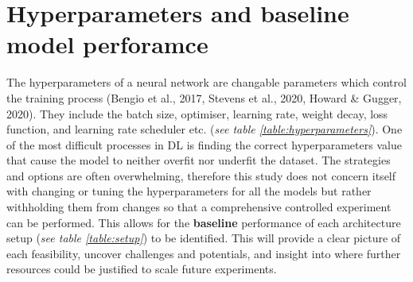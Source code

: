 \documentclass[11pt, a4paper, twoside]{report}
\begin{document}
\begin{table}[H]
  \centering
  \label{table:setup}
  \caption{The U-Nets and the variations thereof selected for this study}
\end{table}

\section{Hyperparameters and baseline model perforamce}

The hyperparameters of a neural network are changable parameters which control the training process (Bengio et al., 2017, Stevens et al., 2020, Howard \& Gugger, 2020). They include the batch size, optimiser, learning rate, weight decay, loss function, and learning rate scheduler etc. (\textit{see table \ref{table:hyperparameters}}). One of the most difficult processes in DL is finding the correct hyperparameters value that cause the model to neither overfit nor underfit the dataset. The strategies and options are often overwhelming, therefore this study does not concern itself with changing or tuning the hyperparameters for all the models but rather withholding them from changes so that a comprehensive controlled experiment can be performed. This allows for the \textbf{baseline} performance of each architecture setup (\textit{see table \ref{table:setup}}) to be identified. This will provide a clear picture of each feasibility, uncover challenges and potentials, and insight into where further resources could be justified to scale future experiments.\\\par
\end{document}
